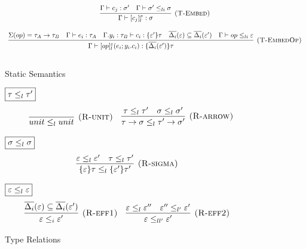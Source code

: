 \documentclass{article}
\theoremstyle{definition}
\begin{document}
\begin{figure}[H]
{\[\begin{array}{c}
\infer[\textsc{(T-Embed)}]
  {\Gamma\vdash [c_j]^\sigma_l : \sigma }
  {\Gamma \vdash c_j : \sigma' & \Gamma \vdash \sigma' \leq_{li} \sigma  } \\[3ex]
  
\infer[\textsc{(T-EmbedOp)}]
  {\Gamma\vdash [op]^\varepsilon_l(e_i; y_i.c_i) : \{\overline{\Delta_i}(\varepsilon')\}\tau }
  {\Sigma(op) = \tau_A \rightarrow \tau_B & \Gamma \vdash e_i : \tau_A & \Gamma. y_i:\tau_B\vdash c_i: \{\varepsilon'\}\tau & \overline{\Delta_i}(\varepsilon) \subseteq \overline{\Delta_i}(\varepsilon') & \Gamma \vdash op \leq_{li} \varepsilon} \\[3ex]
  
\end{array} \\[3ex]
\]
}


\caption{Static Semantics}
\label{wrap-static}
\end{figure}


\begin{figure}[H]
\footnotesize{
\noindent$\fbox{$\tau \leq_l \tau'$}$
\[
\begin{array}{c}

\infer[\textsc{(R-unit)}]
	{unit \leq_l unit}
	{} \quad

\infer[\textsc{(R-arrow)}]
	{\tau \rightarrow \sigma \leq_l \tau' \rightarrow \sigma'}
	{\tau \leq_l \tau' & \sigma \leq_l \sigma'}
  
\end{array} \\[3ex]
\]

\noindent$\fbox{$\sigma \leq_l \sigma$}$
\[
\begin{array}{c}

\infer[\textsc{(R-sigma)}]
	{\{\varepsilon\}\tau \leq_l \{\varepsilon'\}\tau'}
	{ \varepsilon \leq_l \varepsilon' & \tau \leq_l \tau' } \quad
  
\end{array} \\[3ex]
\]

\noindent$\fbox{$\varepsilon \leq_l \varepsilon$}$
\[
\begin{array}{c}

\infer[\textsc{(R-eff1)}]
	{\varepsilon \leq_i \varepsilon'}
	{ \overline{\Delta_i}(\varepsilon) \subseteq \overline{\Delta_i}(\varepsilon')  } \quad

\infer[\textsc{(R-eff2)}]
	{\varepsilon \leq_{ll'} \varepsilon'}
	{  \varepsilon \leq_l \varepsilon'' &   \varepsilon'' \leq_{l'} \varepsilon' } \quad
\end{array} \\[3ex]
\]
}


\caption{Type Relations}
\label{wrap-static}
\end{figure}
\end{document}
